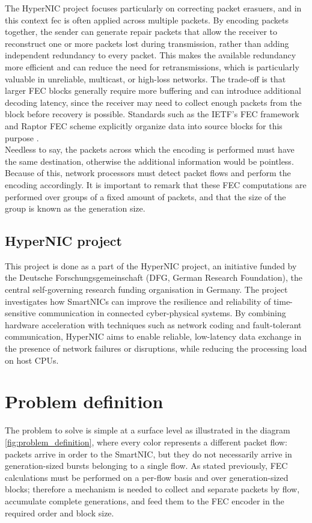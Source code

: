 The HyperNIC project focuses particularly on correcting packet erasuers, and in this context \gls{fec} is often applied across multiple packets. 
By encoding packets together, the sender can generate repair packets that allow the receiver to reconstruct one or more packets lost during 
transmission, rather than adding independent redundancy to every packet. This makes the available redundancy more efficient and can reduce 
the need for retransmissions, which is particularly valuable in unreliable, multicast, or high-loss networks. The trade-off is that larger FEC 
blocks generally require more buffering and can introduce additional decoding latency, since the receiver may need to collect enough packets 
from the block before recovery is possible. Standards such as the IETF's FEC framework and Raptor FEC scheme explicitly organize data into 
source blocks for this purpose \cite{watson2011fec}.\\

Needless to say, the packets across which the encoding is performed must have the same destination, otherwise the additional information 
would be pointless. Because of this, network processors must detect packet flows and perform the encoding accordingly. It is important to remark 
that these FEC computations are performed over groups of a fixed amount of packets, and that the size of the group is known as the 
generation size.

\subsection{HyperNIC project}
This project is done as a part of the HyperNIC project, an initiative funded by the Deutsche Forschungsgemeinschaft (DFG, German Research Foundation), the central self-governing 
research funding organisation in Germany. The project investigates how SmartNICs can improve the resilience and reliability of time-sensitive 
communication in connected cyber-physical systems. By combining hardware acceleration with techniques such as network coding and fault-tolerant communication, 
HyperNIC aims to enable reliable, low-latency data exchange in the presence of network failures or disruptions, while reducing the processing load on host CPUs.

\section{Problem definition}
The problem to solve is simple at a surface level as illustrated in the diagram \ref{fig:problem_definition},
where every color represents a different packet flow: packets arrive in order to the SmartNIC, but they do not necessarily arrive in generation-sized bursts 
belonging to a single flow. As stated previously, FEC calculations must be performed on a per-flow basis and over generation-sized blocks; therefore 
a mechanism is needed to collect and separate packets by flow, accumulate complete generations, and feed them to the FEC encoder in the 
required order and block size.


